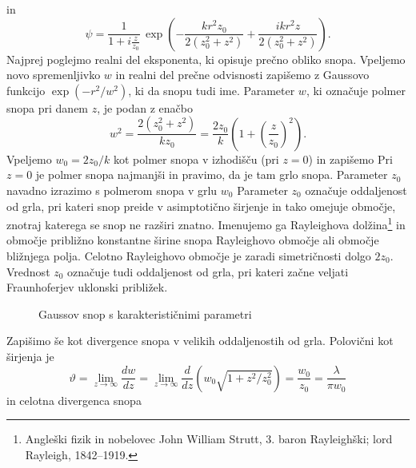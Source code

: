 in
\begin{equation}
 \psi = \frac{1}{1+i\frac{z}{z_{0}}}\,\exp\left(-\frac{kr^{2}z_{0}}{2(z_{0}^{2}+z^{2})}+
 \frac{ikr^{2}z}{2(z_{0}^{2}+z^{2})}\right).
 \label{eq:gaussov-snop-vmesni}
\end{equation}
Najprej poglejmo realni del eksponenta, ki opisuje prečno obliko snopa. Vpeljemo novo spremenljivko $w$
in realni del prečne odvisnosti zapišemo z Gaussovo funkcijo $\exp(-r^2/w^2)$, 
ki da snopu tudi ime. Parameter $w$, ki označuje 
polmer snopa pri danem $z$, je podan z enačbo 
\begin{equation}
w^2 = \frac{2(z_0^2+z^2)}{kz_0}= \frac{2z_0}{k}\left(1+\left(\frac{z}{z_0}\right)^2\right).
\end{equation}
Vpeljemo $w_0 = 2z_0/k$ kot polmer snopa v izhodišču (pri $z=0$) in zapišemo
Pri $z=0$ je polmer snopa najmanjši in pravimo, da je tam grlo snopa. Parameter $z_0$ 
navadno izrazimo s polmerom snopa v grlu $w_0$
Parameter $z_{0}$ označuje oddaljenost od grla, 
pri kateri snop preide v asimptotično širjenje in tako omejuje območje,
znotraj katerega se snop ne razširi znatno. Imenujemo ga 
Rayleighova dolžina\footnote{Angleški fizik in 
nobelovec John William Strutt, 3. baron Rayleighški; lord Rayleigh, 1842--1919.}
in območje približno konstantne širine snopa Rayleighovo
območje ali območje bližnjega 
polja. Celotno Rayleighovo 
območje je zaradi simetričnosti dolgo $2z_0$. 
Vrednost $z_{0}$ označuje tudi oddaljenost od grla, pri kateri začne veljati 
Fraunhoferjev uklonski približek. 
\begin{figure}[h]
\centering
\def\svgwidth{120truemm} 

\caption{Gaussov snop s karakterističnimi parametri}
\label{fig:Gauss}
\end{figure}

Zapišimo še kot divergence snopa v velikih oddaljenostih od grla. Polovični kot širjenja je
\begin{equation}
\vartheta=\lim_{z \to \infty} \frac{dw}{dz} = \lim_{z \to \infty}\frac{d}{dz} \left(w_0\sqrt{1+z^2/z_0^2}\right)=
\frac{w_{0}}{z_{0}}= \frac{\lambda}{\pi w_{0}}\label{eq:divergenca-snopa}
\end{equation}
in celotna divergenca snopa

